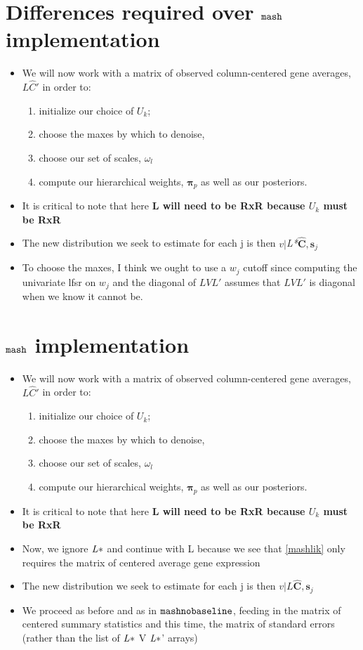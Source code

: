 \documentclass[11pt, oneside]{article}   	%
\newcommand{\chat}{\bm{\hat{C}}}
\def\lstar{{\it L*}}
\def\mash{{\tt mash}}
\def\mnb{{\tt mashnobaseline}}
\begin{document}
\begin{itemize}
\section{Differences required over $\mash$ implementation}

\begin{itemize}
\item We will now work with a matrix of observed column-centered gene averages, $L \hat{C} '$ in order to:
\begin{enumerate}
	\item initialize our choice of $U_{k}$;
	\item  choose the maxes by which to denoise, 
	\item choose our set of scales, $\omega_{l}$
	\item compute our hierarchical weights, $\bm{\pi}_{p}$ as well as our posteriors. 
\end{enumerate}
\item It is critical to note that here \textbf{L will need to be RxR because $U_{k}$ must be RxR}
\item The new distribution we seek to estimate for each j is then $v | $\lstar$ \chat , \bm{s}_{j}$
\item To choose the maxes, I think we ought to use a $w_{j}$ cutoff since computing the univariate lfsr on $w_{j}$ and the diagonal of $LVL'$ assumes that $LVL'$ is diagonal when we know it cannot be.
\end{itemize}

\section{ $\mash$ implementation}

\begin{itemize}
\item We will now work with a matrix of observed column-centered gene averages, $L \hat{C} '$ in order to:
\begin{enumerate}
	\item initialize our choice of $U_{k}$;
	\item  choose the maxes by which to denoise, 
	\item choose our set of scales, $\omega_{l}$
	\item compute our hierarchical weights, $\bm{\pi}_{p}$ as well as our posteriors. 
\end{enumerate}
\item It is critical to note that here \textbf{L will need to be RxR because $U_{k}$ must be RxR}
\item Now, we ignore $\lstar$ and continue with L because we see that \ref{mashlik} only requires the matrix of centered average gene expression
\item The new distribution we seek to estimate for each j is then $v | L \chat , \bm{s}_{j}$
\item We proceed as before and as in $\mnb$, feeding in the matrix of centered summary statistics and this time, the matrix of standard errors (rather than the list of $\lstar$ V $\lstar$' arrays)
\end{itemize}


\end{itemize}
\end{document}

